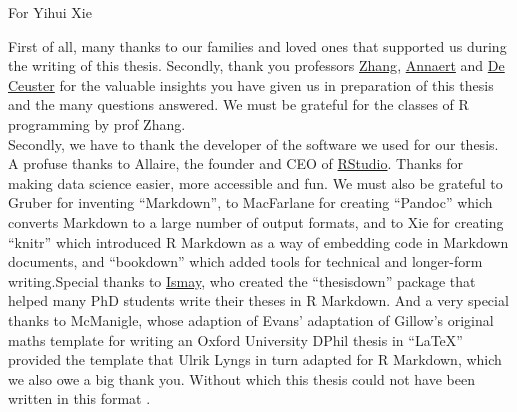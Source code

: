 \documentclass[a4paper, twoside]{templates/ociamthesis}
\begin{document}
\setcounter{secnumdepth}{2}
\setcounter{tocdepth}{2}



\begin{romanpages}

\maketitle

\begin{dedication}
  For Yihui Xie
\end{dedication}

\begin{acknowledgements}
 	First of all, many thanks to our families and loved ones that supported us during the writing of this thesis. Secondly, thank you professors \href{https://www.antwerpmanagementschool.be/nl/faculty/hairui-zhang}{Zhang}, \href{https://www.antwerpmanagementschool.be/nl/faculty/jan-annaert}{Annaert} and \href{https://www.antwerpmanagementschool.be/nl/faculty/marc-de-ceuster}{De Ceuster} for the valuable insights you have given us in preparation of this thesis and the many questions answered. We must be grateful for the classes of R programming by prof Zhang. ~\\

  \noindent Secondly, we have to thank the developer of the software we used for our thesis. A profuse thanks to Allaire, the founder and CEO of \href{http://rstudio.com}{RStudio}. Thanks for making data science easier, more accessible and fun. We must also be grateful to Gruber for inventing ``Markdown'', to MacFarlane for creating ``Pandoc'' which converts Markdown to a large number of output formats, and to Xie for creating ``knitr'' which introduced R Markdown as a way of embedding code in Markdown documents, and ``bookdown'' which added tools for technical and longer-form writing.Special thanks to \href{http://chester.rbind.io}{Ismay}, who created the ``thesisdown'' package that helped many PhD students write their theses in R Markdown. And a very special thanks to McManigle, whose adaption of Evans' adaptation of Gillow's original maths template for writing an Oxford University DPhil thesis in ``LaTeX'' provided the template that Ulrik Lyngs in turn adapted for R Markdown, which we also owe a big thank you. Without which this thesis could not have been written in this format \autocite{lyngsOxforddown2019}. ~\\


\end{acknowledgements}
\end{romanpages}
\end{document}

